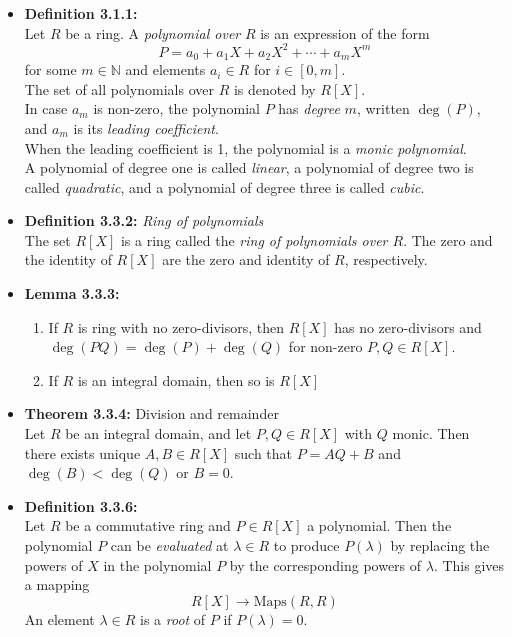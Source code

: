 \documentclass[11pt,a4paper]{article}
\begin{document}
\begin{itemize}

    \item \textbf{Definition 3.1.1:} \\
        Let $R$ be a ring.
        A \emph{polynomial over} $R$ is an expression of the form
        \[
            P = a_0 + a_1X + a_2{X^2} + \cdots + a_m{X^m}
        \]
        for some $m \in \mathbb{N}$ and elements $a_i \in R$ for $i \in [0,m]$.\\
        The set of all polynomials over $R$ is denoted by $R[X]$.\\
        In case $a_m$ is non-zero, the polynomial $P$ has \emph{degree} $m$, written $\deg(P)$, and
        $a_m$ is its \emph{leading coefficient}. \\
        When the leading coefficient is 1, the polynomial is a \emph{monic polynomial}.\\
        A polynomial of degree one is called \emph{linear},
        a polynomial of degree two is called \emph{quadratic},
        and a polynomial of degree three is called \emph{cubic}.

    \item \textbf{Definition 3.3.2:} \emph{Ring of polynomials} \\
        The set $R[X]$ is a ring called the \emph{ring of polynomials over $R$}.
        The zero and the identity of $R[X]$ are the zero and identity of $R$, respectively.

    \item \textbf{Lemma 3.3.3:}
        \begin{enumerate}
            \item If $R$ is ring with no zero-divisors, then $R[X]$ has no zero-divisors and
                $\deg(PQ) = \deg(P) + \deg(Q)$ for non-zero $P,Q \in R[X]$.
            \item If $R$ is an integral domain, then so is $R{[X]}$
        \end{enumerate}

    \item \textbf{Theorem 3.3.4:} Division and remainder \\
        Let $R$ be an integral domain, and let $P,Q \in R[X]$ with $Q$ monic.
        Then there exists unique $A,B \in R{[X]}$ such that
        $P=AQ + B$ and $\deg(B) < \deg(Q)$ or $B=0$.

    \item \textbf{Definition 3.3.6:} \\
        Let $R$ be a commutative ring and $P \in R[X]$ a polynomial.
        Then the polynomial $P$ can be \emph{evaluated} at $\lambda \in R$ to produce $P(\lambda)$
        by replacing the powers of $X$ in the polynomial $P$ by the corresponding powers of
        $\lambda$.
        This gives a mapping
        \[
            R[X] \to \mathrm{Maps}(R,R)
        \]
        An element $\lambda \in R$ is a \emph{root} of $P$ if $P(\lambda) = 0$.


\end{itemize}
\end{document}
